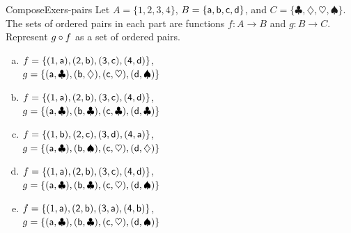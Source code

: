 \begin{exercise}{ComposeExers-pairs} 
 Let $A = \{1,2,3,4\}$, $B = \{\sf{a},\sf{b},\sf{c},\sf{d}\}$, and $C = \{\clubsuit, \diamondsuit, \heartsuit, \spadesuit\}$. The sets of ordered pairs in each part are functions $f \colon A \to B$ and $g \colon B \to C$. Represent $g \circ f$ as a set of ordered pairs.
\smallskip
\begin{enumerate}[(a)]
\item \label{ComposeExers-pairs-(abcd)(cdhs)} 
 $f = \{(1,\sf{a}), (2,\sf{b}), (3,\sf{c}), (4,\sf{d})\}$,
 \\ $g = \{(\sf{a},\clubsuit), (\sf{b},\diamondsuit), (\sf{c},\heartsuit), (\sf{d},\spadesuit) \}$
\smallskip
\item \label{ComposeExers-pairs-(abcd)(cccc)} 
 $f = \{(1,\sf{a}), (2,\sf{b}), (3,\sf{c}), (4,\sf{d})\}$,
 \\ $g = \{(\sf{a},\clubsuit), (\sf{b},\clubsuit), (\sf{c},\clubsuit), (\sf{d},\clubsuit) \}$
\smallskip
\item \label{ComposeExers-pairs-(bcda)(cshd)} 
 $f = \{(1,\sf{b}), (2,\sf{c}), (3,\sf{d}), (4,\sf{a})\}$,
 \\ $g = \{(\sf{a},\clubsuit), (\sf{b}, \spadesuit), (\sf{c},\heartsuit), (\sf{d}, \diamondsuit) \}$
\smallskip
\item \label{ComposeExers-pairs-(abcd)(cchs)} 
 $f = \{(1,\sf{a}), (2,\sf{b}), (3,\sf{c}), (4,\sf{d})\}$,
 \\ $g= \{(\sf{a},\clubsuit), (\sf{b},\clubsuit), (\sf{c}, \heartsuit), (\sf{d}, \spadesuit) \}$
\smallskip
\item \label{ComposeExers-pairs-(abab)(cchs)} 
 $f = \{(1,\sf{a}), (2,\sf{b}), (3,\sf{a}), (4,\sf{b})\}$,
 \\ $g = \{(\sf{a},\clubsuit), (\sf{b},\clubsuit), (\sf{c}, \heartsuit), (\sf{d}, \spadesuit) \}$
\end{enumerate}
\end{exercise}

